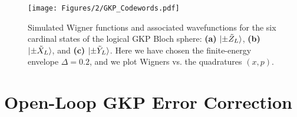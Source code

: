 \begin{figure}
    \centering
    \texttt{[image: Figures/2/GKP\_Codewords.pdf]}
    \caption[Simulated Wigner functions and associated wavefunctions for the six cardinal states of the logical GKP Bloch sphere:$\ket{\pm \tilde{Z}_L}$, $\ket{\pm \tilde{X}_L}$, $\ket{\pm \tilde{Y}_L}$.]{Simulated Wigner functions and associated wavefunctions for the six cardinal states of the logical GKP Bloch sphere: \textbf{(a)} $\ket{\pm \tilde{Z}_L}$, \textbf{(b)} $\ket{\pm \tilde{X}_L}$, and \textbf{(c)} $\ket{\pm \tilde{Y}_L}$. Here we have chosen the finite-energy envelope $\Delta = 0.2$, and we plot Wigners vs. the quadratures $(x, p)$.}
    \label{fig:2_GKP_Codewords}
\end{figure}
\clearpage

\section{Open-Loop GKP Error Correction \label{sec:2_OpenLoopGKPQEC}}

